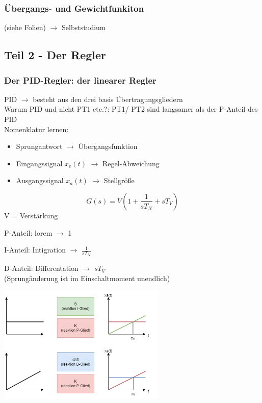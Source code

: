 \documentclass{article}
\begin{document}
\subsubsection*{Übergangs- und Gewichtfunkiton}
(siehe Folien) $\rightarrow$ Selbststudium

\newpage
\subsection*{Teil 2 - Der Regler}
\subsubsection*{Der PID-Regler: der linearer Regler}
PID $\rightarrow$ besteht aus den drei basis Übertragungsgliedern \\
Warum PID und nicht PT1 etc.?: PT1/ PT2 sind langsamer als der P-Anteil des PID \\

Nomenklatur lernen: 
\begin{itemize}
	\item Sprungantwort $\rightarrow$ Übergangsfunktion
	\item Eingangssignal $x_e(t)$ $\rightarrow$ Regel-Abweichung
	\item Ausgangssignal $x_a(t)$ $\rightarrow$ Stellgröße
\end{itemize}

\[
G(s) = V(1+ \frac{1}{sT_N}+ sT_V)
\]
V = Verstärkung
\begin{multicols}{3}
	P-Anteil: lorem $\rightarrow$  1

	\columnbreak
	I-Anteil: Intigration $\rightarrow$ $\frac{1}{sT_N}$

	\columnbreak
	D-Anteil: Differentation $\rightarrow$ $sT_V$ \\
	(Sprungänderung ist im Einschaltmoment unendlich)
\end{multicols}
\begin{center}
	\includegraphics[width=0.6\textwidth]{19_11_2024_reglungstechnik.png}
\end{center}
\end{document}
